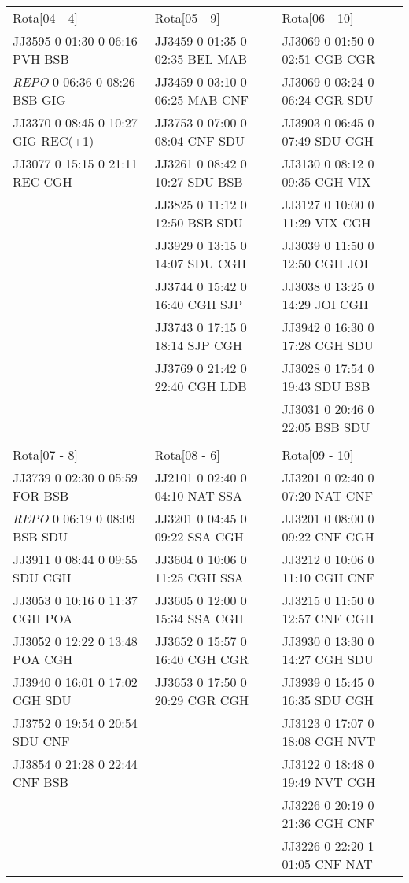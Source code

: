 \begin{scriptsize}
\begin{longtable}{l l l}
Rota[04 - 4]  & Rota[05 - 9]  & Rota[06 - 10] \\
JJ3595 0 01:30 0 06:16 PVH BSB & JJ3459 0 01:35 0 02:35 BEL MAB & JJ3069 0 01:50 0 02:51 CGB CGR\\
\textit{REPO}   0 06:36 0 08:26 BSB GIG & JJ3459 0 03:10 0 06:25 MAB CNF &
JJ3069 0 03:24 0 06:24 CGR SDU\\ 
JJ3370 0 08:45 0 10:27 GIG REC(+1) & JJ3753 0 07:00 0 08:04 CNF SDU & JJ3903 0
06:45 0 07:49 SDU CGH\\ 
JJ3077 0 15:15 0 21:11 REC CGH & JJ3261 0 08:42 0 10:27 SDU BSB & JJ3130 0 08:12 0 09:35 CGH VIX\\
 & JJ3825 0 11:12 0 12:50 BSB SDU & JJ3127 0 10:00 0 11:29 VIX CGH\\
 & JJ3929 0 13:15 0 14:07 SDU CGH & JJ3039 0 11:50 0 12:50 CGH JOI\\
 & JJ3744 0 15:42 0 16:40 CGH SJP & JJ3038 0 13:25 0 14:29 JOI CGH\\
 & JJ3743 0 17:15 0 18:14 SJP CGH & JJ3942 0 16:30 0 17:28 CGH SDU\\
 & JJ3769 0 21:42 0 22:40 CGH LDB & JJ3028 0 17:54 0 19:43 SDU BSB\\
 &  & JJ3031 0 20:46 0 22:05 BSB SDU\\

\\

Rota[07 - 8]  & Rota[08 - 6]  & Rota[09 - 10] \\
JJ3739 0 02:30 0 05:59 FOR BSB & JJ2101 0 02:40 0 04:10 NAT SSA & JJ3201 0 02:40 0 07:20 NAT CNF\\
\textit{REPO}   0 06:19 0 08:09 BSB SDU & JJ3201 0 04:45 0 09:22 SSA CGH &
JJ3201 0 08:00 0 09:22 CNF CGH\\ 
JJ3911 0 08:44 0 09:55 SDU CGH & JJ3604 0 10:06 0 11:25 CGH SSA & JJ3212 0 10:06 0 11:10 CGH CNF\\
JJ3053 0 10:16 0 11:37 CGH POA & JJ3605 0 12:00 0 15:34 SSA CGH & JJ3215 0 11:50 0 12:57 CNF CGH\\
JJ3052 0 12:22 0 13:48 POA CGH & JJ3652 0 15:57 0 16:40 CGH CGR & JJ3930 0 13:30 0 14:27 CGH SDU\\
JJ3940 0 16:01 0 17:02 CGH SDU & JJ3653 0 17:50 0 20:29 CGR CGH & JJ3939 0 15:45 0 16:35 SDU CGH\\
JJ3752 0 19:54 0 20:54 SDU CNF & & JJ3123 0 17:07 0 18:08 CGH NVT\\
JJ3854 0 21:28 0 22:44 CNF BSB & & JJ3122 0 18:48 0 19:49 NVT CGH\\
 &  & JJ3226 0 20:19 0 21:36 CGH CNF\\
 &  & JJ3226 0 22:20 1 01:05 CNF NAT\\


\end{longtable}
\end{scriptsize}

